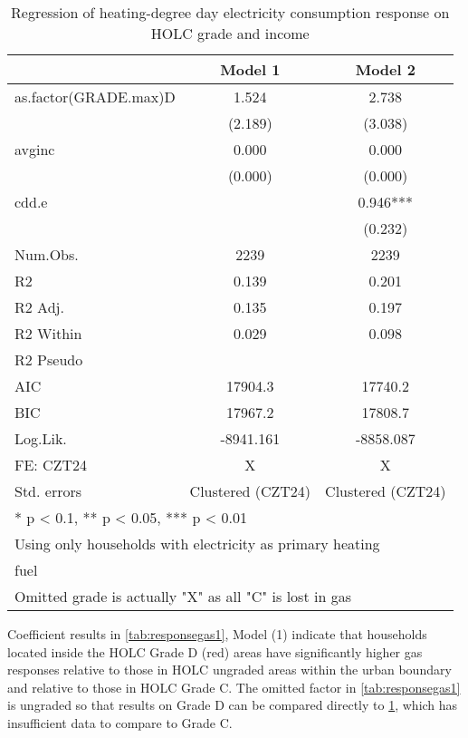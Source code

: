 \documentclass[
]{article}
\begin{document}
\begin{table}

\caption{\label{tab:RASS-1ex}Regression of heating-degree day electricity consumption response on HOLC grade and income\label{tab:responseelectric1}}
\centering
\begin{tabular}[t]{lcc}
\toprule
  & Model 1 & Model 2\\
\midrule
as.factor(GRADE.max)D & 1.524 & 2.738\\
 & (2.189) & (3.038)\\
avginc & 0.000 & 0.000\\
 & (0.000) & (0.000)\\
cdd.e &  & 0.946***\\
 &  & (0.232)\\
\midrule
Num.Obs. & 2239 & 2239\\
R2 & 0.139 & 0.201\\
R2 Adj. & 0.135 & 0.197\\
R2 Within & 0.029 & 0.098\\
R2 Pseudo &  & \\
AIC & 17904.3 & 17740.2\\
BIC & 17967.2 & 17808.7\\
Log.Lik. & -8941.161 & -8858.087\\
FE: CZT24 & X & X\\
Std. errors & Clustered (CZT24) & Clustered (CZT24)\\
\bottomrule
\multicolumn{3}{l}{\textsuperscript{} * p < 0.1, ** p < 0.05, *** p < 0.01}\\
\multicolumn{3}{l}{\textsuperscript{} Using only households with electricity as primary heating}\\
\multicolumn{3}{l}{fuel}\\
\multicolumn{3}{l}{\textsuperscript{} Omitted grade is actually "X" as all "C" is lost in gas}\\
\end{tabular}
\end{table}

Coefficient results in \ref{tab:responsegas1}, Model (1) indicate that
households located inside the HOLC Grade D (red) areas have
significantly higher gas responses relative to those in HOLC ungraded
areas within the urban boundary and relative to those in HOLC Grade C.
The omitted factor in \ref{tab:responsegas1} is ungraded so that results
on Grade D can be compared directly to \ref{tab:responseelectric1},
which has insufficient data to compare to Grade C.
\end{document}
